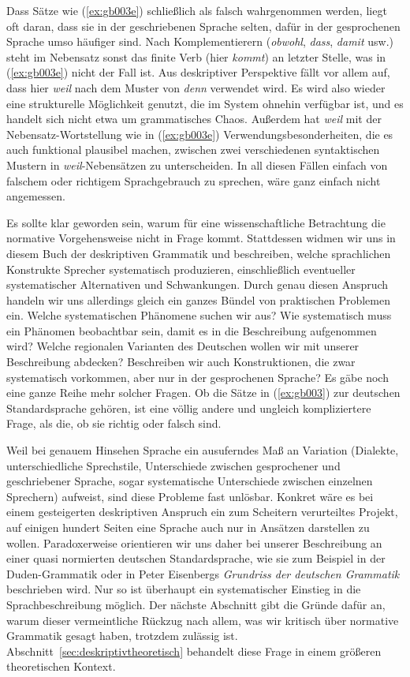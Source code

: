 Dass Sätze wie (\ref{ex:gb003e}) schließlich als falsch wahrgenommen werden, liegt oft daran, dass sie in der geschriebenen Sprache selten, dafür in der gesprochenen Sprache umso häufiger sind.
Nach Komplementierern (\textit{obwohl}, \textit{dass}, \textit{damit} usw.) steht im Nebensatz sonst das finite Verb (hier \textit{kommt}) an letzter Stelle, was in (\ref{ex:gb003e}) nicht der Fall ist.
Aus deskriptiver Perspektive fällt vor allem auf, dass hier \textit{weil} nach dem Muster von \textit{denn} verwendet wird.
Es wird also wieder eine strukturelle Möglichkeit genutzt, die im System ohnehin verfügbar ist, und es handelt sich nicht etwa um grammatisches Chaos.
Außerdem hat \textit{weil} mit der Nebensatz-Wortstellung wie in (\ref{ex:gb003e}) Verwendungsbesonderheiten, die es auch funktional plausibel machen, zwischen zwei verschiedenen syntaktischen Mustern in \textit{weil}-Nebensätzen zu unterscheiden.
In all diesen Fällen einfach von falschem oder richtigem Sprachgebrauch zu sprechen, wäre ganz einfach nicht angemessen.

Es sollte klar geworden sein, warum für eine wissenschaftliche Betrachtung die normative Vorgehensweise nicht in Frage kommt.
Stattdessen widmen wir uns in diesem Buch der deskriptiven Grammatik und beschreiben, welche sprachlichen Konstrukte Sprecher systematisch produzieren, einschließlich eventueller systematischer Alternativen und Schwankungen.
Durch genau diesen Anspruch handeln wir uns allerdings gleich ein ganzes Bündel von praktischen Problemen ein.
Welche systematischen Phänomene suchen wir aus?
Wie systematisch muss ein Phänomen beobachtbar sein, damit es in die Beschreibung aufgenommen wird?
Welche regionalen Varianten des Deutschen wollen wir mit unserer Beschreibung abdecken?
Beschreiben wir auch Konstruktionen, die zwar systematisch vorkommen, aber nur in der gesprochenen Sprache?
Es gäbe noch eine ganze Reihe mehr solcher Fragen.
Ob die Sätze in (\ref{ex:gb003}) zur deutschen Standardsprache gehören, ist eine völlig andere und ungleich kompliziertere Frage, als die, ob sie richtig oder falsch sind.

Weil bei genauem Hinsehen Sprache ein ausuferndes Maß an Variation (Dialekte, unterschiedliche Sprechstile, Unterschiede zwischen gesprochener und geschriebener Sprache, sogar systematische Unterschiede zwischen einzelnen Sprechern) aufweist, sind diese Probleme fast unlösbar.
Konkret wäre es bei einem gesteigerten deskriptiven Anspruch ein zum Scheitern verurteiltes Projekt, auf einigen hundert Seiten eine Sprache auch nur in Ansätzen darstellen zu wollen.
Paradoxerweise orientieren wir uns daher bei unserer Beschreibung an einer quasi normierten deutschen Standardsprache, wie sie zum Beispiel in der Duden-Grammatik oder in Peter Eisenbergs \textit{Grundriss der deutschen Grammatik} \citep{Eisenberg1,Eisenberg2} beschrieben wird.
Nur so ist überhaupt ein systematischer Einstieg in die Sprachbeschreibung möglich.
Der nächste Abschnitt gibt die Gründe dafür an, warum dieser vermeintliche Rückzug nach allem, was wir kritisch über normative Grammatik gesagt haben, trotzdem zulässig ist.
Abschnitt~\ref{sec:deskriptivtheoretisch} behandelt diese Frage in einem größeren theoretischen Kontext.


